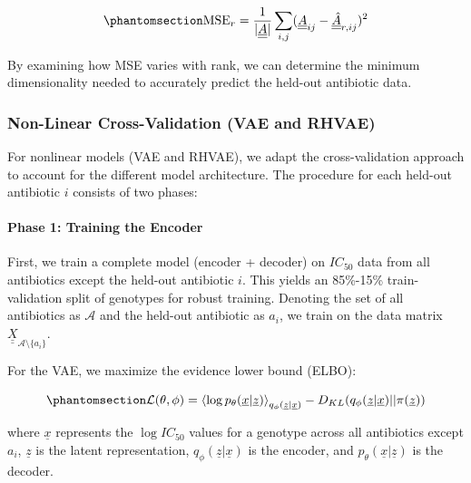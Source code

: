 \documentclass[
]{scrartcl}
\let\oldparagraph\paragraph
\renewcommand{\paragraph}[1]{\oldparagraph{#1}\mbox{}}
\begin{document}
\begin{refsection}
\begin{equation}\phantomsection\label{eq-crossvalidation-svd-svd-mse}{
\text{MSE}_r =
\frac{1}{|\underline{\underline{A}}|}\sum_{i,j}(\underline{\underline{A}}_{ij} -
\underline{\underline{\hat{A}}}_{r,ij})^2
}\end{equation}

By examining how MSE varies with rank, we can determine the minimum
dimensionality needed to accurately predict the held-out antibiotic
data.

\subsubsection{Non-Linear Cross-Validation (VAE and
RHVAE)}\label{non-linear-cross-validation-vae-and-rhvae}

For nonlinear models (VAE and RHVAE), we adapt the cross-validation
approach to account for the different model architecture. The procedure
for each held-out antibiotic \(i\) consists of two phases:

\paragraph{Phase 1: Training the
Encoder}\label{phase-1-training-the-encoder}

First, we train a complete model (encoder + decoder) on \(IC_{50}\) data
from all antibiotics except the held-out antibiotic \(i\). This yields
an 85\%-15\% train-validation split of genotypes for robust training.
Denoting the set of all antibiotics as \(\mathcal{A}\) and the held-out
antibiotic as \(a_i\), we train on the data matrix
\(\underline{\underline{X}}_{\mathcal{A} \setminus \{a_i\}}\).

For the VAE, we maximize the evidence lower bound (ELBO):

\begin{equation}\phantomsection\label{eq-crossvalidation-vae-elbo}{
\mathcal{L}(\theta, \phi) = 
\left\langle 
    \log p_\theta(\underline{x}|\underline{z}) 
\right\rangle_{q_\phi(\underline{z}|\underline{x})} -
D_{KL}(q_\phi(\underline{z}|\underline{x}) || \pi(\underline{z}))
}\end{equation}

where \(\underline{x}\) represents the \(\log IC_{50}\) values for a
genotype across all antibiotics except \(a_i\), \(\underline{z}\) is the
latent representation, \(q_\phi(\underline{z}|\underline{x})\) is the
encoder, and \(p_\theta(\underline{x}|\underline{z})\) is the decoder.


\end{refsection}
\end{document}
